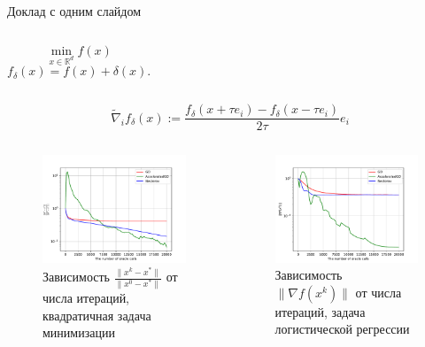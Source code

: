 \documentclass{beamer}
\begin{document}
\begin{frame}{Доклад с одним слайдом}

\begin{columns}[c]
    $$\min\limits_{x \in \mathbb{R}^d} f(x)$$
    $$f_\delta (x) = f(x) + \delta (x).$$
\end{columns}

$$\widetilde{\nabla}_i f_\delta (x) := \frac{f_\delta (x + \tau e_i) - f_\delta (x - \tau e_i)}{2\tau} e_i$$

\begin{columns}[c]
    \begin{figure}
    \includegraphics[width=1.0\textwidth]{Deterministic_quadratic_GD_AGD_Nesterov_15.pdf}
        \caption{Зависимость $\frac{\|x^k - x^*\|}{\|x^0 - x^*\|}$ от числа итераций, квадратичная задача минимизации}
    \end{figure}

    \begin{figure}
    \includegraphics[width=1.0\textwidth]{Non_stochastic_Logreg_GD_AGD_Nesterov_15_1e-07_1e-05.pdf}
        \caption{Зависимость $\|\nabla f(x^k)\|$ от числа итераций, задача логистической регрессии}
    \end{figure}
\end{columns}


\end{frame}
\end{document}
